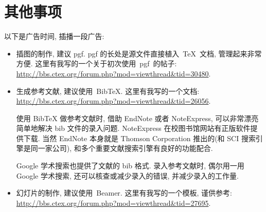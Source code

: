 \documentclass{WHUMaster}   %
\begin{document}

%







\chapter{其他事项}
以下是广告时间, 插播一段广告:
\begin{itemize}
    \item 插图的制作, 建议 pgf.
          pgf 的长处是源文件直接植入~\TeX~文档, 管理起来非常方便.
    这里有我写的一个关于初次使用~pgf~的帖子:\\    \url{http://bbs.ctex.org/forum.php?mod=viewthread&tid=30480}.
    \item 生成参考文献, 建议使用~BibTeX.  这里有我写的一个文档: \\
    \url{http://bbs.ctex.org/forum.php?mod=viewthread&tid=26056}.

      {\kaishu 使用 BibTeX{} 做参考文献时,
      借助 EndNote 或者 NoteExpress, 可以非常漂亮简单地解决 bib 文件的录入问题.
      NoteExpress 在校图书馆网站有正版软件提供下载.
      当然 EndNote 本身就是 Thomson Corporation 推出的(和 SCI 搜索引擎是同一家公司),
      和多个重要文献搜索引擎有良好的功能配合.

      Google 学术搜索也提供了文献的 bib 格式.
      录入参考文献时, 偶尔用一用 Google 学术搜索, 还可以核查或减少录入的错误, 并减少录入的工作量.}
     \item 幻灯片的制作, 建议使用~Beamer. 这里有我写的一个模板, 谨供参考:\\
    \url{http://bbs.ctex.org/forum.php?mod=viewthread&tid=27695}.
\end{itemize}
\end{document}
